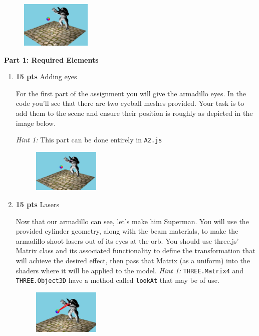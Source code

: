 \documentclass[12pt]{exam}
\begin{document}
\begin{figure}[H]
    \centering
    \includegraphics[width=0.3\textwidth]{./init.png}
\end{figure}

{\bf Part 1: Required Elements}

\renewcommand{\labelenumi}{(\alph{enumi})}
\begin{enumerate}

\item {\bf 15 pts} Adding eyes
\label{ref:simpleorb}

For the first part of the assignment you will give the armadillo eyes. In the code you'll see that there are two eyeball meshes provided. Your task is to add them to the scene and ensure  their position is roughly as depicted in the image below. 

  \textit{Hint 1: }This part can be done entirely in {\tt A2.js} 

    \begin{figure}[H]
    \centering
    \includegraphics[width=0.3\textwidth]{./qa.png}
    \end{figure}
    
\item {\bf 15 pts} Lasers
\label{ref:simpleorb}

  Now that our armadillo can see, let's make him Superman. You will use the provided cylinder geometry, along with the beam materials, to  make the armadillo shoot lasers out of its eyes at the orb. You should use three.js’ Matrix class and its associated functionality to define the transformation that will achieve the desired effect, then pass that Matrix (as a uniform) into the shaders where it will be applied to the model. 
    \textit{Hint 1: } {\tt THREE.Matrix4} and {\tt THREE.Object3D} have a method called {\tt lookAt} that may be of use. 
    
    \begin{figure}[H]
    \centering
    \includegraphics[width=0.3\textwidth]{./qb.png}
    \end{figure}


\end{enumerate}
\end{document}
